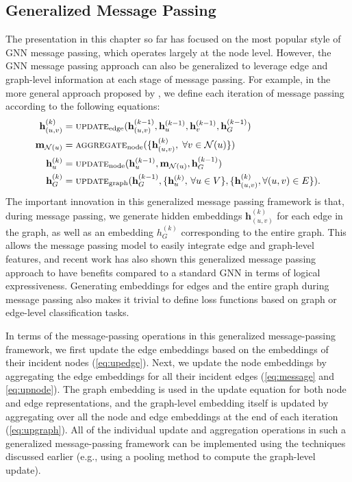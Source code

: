 \documentclass[10pt]{book}
\begin{document}
\subsection{Generalized Message Passing}

The presentation in this chapter so far has focused on the most popular style of GNN message passing, which operates largely at the node level. However, the GNN message passing approach can also be generalized to leverage edge and graph-level information at each stage of message passing. For example, in the more general approach proposed by \cite{battaglia2018relational}, we define each iteration of message passing according to the following equations:
\begin{align}
    \mathbf h^{(k)}_{(u,v)} &= \textsc{update}_\text{edge} (\mathbf h_{(u,v)}^{(k-1)}, \mathbf h_u^{(k-1)}, \mathbf h_v^{(k-1)}, \mathbf h_G^{(k-1)})
    \label{eq:upedge} \\
    \mathbf m_{\mathcal N(u)} &= \textsc{aggregate}_\text{node}(\{ \mathbf h_{(u,v)}^{(k)}, \; \forall v \in \mathcal N(u) \})
    \label{eq:message} \\
    \mathbf h^{(k)}_u &= \textsc{update}_\text{node} ( \mathbf h_u^{(k-1)}, \mathbf m_{\mathcal N(u)}, \mathbf h_G^{(k-1)})
    \label{eq:upnode} \\
    \mathbf h^{(k)}_G &= \textsc{update}_\text{graph}(\mathbf h_G^{( k-1)}, \{ \mathbf h_u^{(k)}, \, \forall u \in V\}, \{ \mathbf h_{(u,v)}^{(k)}, \forall (u, v) \in E\}).
    \label{eq:upgraph}
\end{align}
The important innovation in this generalized message passing framework is that, during message passing, we generate hidden embeddings $\mathbf h_{(u,v)}^{(k)}$ for each edge in the graph, as well as an embedding $h_G^{(k)}$ corresponding to the entire graph. This allows the message passing model to easily integrate edge and graph-level features, and recent work has also shown this generalized message passing approach to have benefits compared to a standard GNN in terms of logical expressiveness. Generating embeddings for edges and the entire graph during message passing also makes it trivial to define loss functions based on graph or edge-level classification tasks.

In terms of the message-passing operations in this generalized message-passing framework, we first update the edge embeddings based on the embeddings of their incident nodes (\autoref{eq:upedge}). Next, we update the node embeddings by aggregating the edge embeddings for all their incident edges (\autoref{eq:message} and \ref{eq:upnode}). The graph embedding is used in the update equation for both node and edge representations, and the graph-level embedding itself is updated by aggregating over all the node and edge embeddings at the end of each iteration (\autoref{eq:upgraph}). All of the individual update and aggregation operations in such a generalized message-passing framework can be implemented using the
techniques discussed earlier (e.g., using a pooling method to compute the graph-level update).
\end{document}

